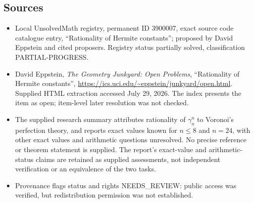 \documentclass[11pt]{article}
\begin{document}
\subsection{Sources}
\begin{itemize}
\item Local UnsolvedMath registry, permanent ID 3900007, exact source code catalogue entry, ``Rationality of Hermite constants''; proposed by David Eppstein and cited proposers. Registry status partially solved, classification PARTIAL-PROGRESS.
\item David Eppstein, \emph{The Geometry Junkyard: Open Problems}, ``Rationality of Hermite constants'', \url{https://ics.uci.edu/~eppstein/junkyard/open.html}. Supplied HTML extraction accessed July 29, 2026. The index presents the item as open; item-level later resolution was not checked.
\item The supplied research summary attributes rationality of $\gamma_n^n$ to Voronoi's perfection theory, and reports exact values known for $n\leq8$ and $n=24$, with other exact values and arithmetic questions unresolved. No precise reference or theorem statement is supplied. The report's exact-value and arithmetic-status claims are retained as supplied assessments, not independent verification or an equivalence of the two tasks.
\item Provenance flags status and rights NEEDS\_REVIEW: public access was verified, but redistribution permission was not established.
\end{itemize}
\end{document}
